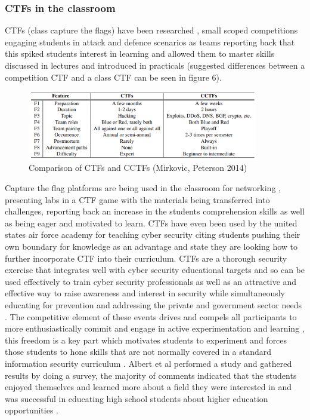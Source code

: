\documentclass[12pt,a4paper]{article}
\begin{document}
\subsubsection{CTFs in the classroom}
CTFs (class capture the flags) have been researched \cite{mirkovic2014class}, small scoped competitions engaging students in attack and defence scenarios as teams reporting back that this spiked students interest in learning and allowed them to master skills discussed in lectures and introduced in practicals (suggested differences between a competition CTF and a class CTF can be seen in figure 6).  
\begin{figure}[h]
    \centering
    \includegraphics[width=0.9\textwidth]{Figs/cctfs.PNG} 
    \caption{Comparison of CTFs and CCTFs (Mirkovic, Peterson 2014)}
\end{figure}   
Capture the flag platforms are being used in the classroom for networking \cite{prabawa2017using}, presenting labs in a CTF game with the materials being transferred into challenges, reporting back an increase in the students comprehension skills as well as being eager and motivated to learn. CTFs have even been used by the united states air force academy for teaching cyber security \cite{carlisle2015using} citing students pushing their own boundary for knowledge as an advantage and state they are looking how to further incorporate CTF into their curriculum. CTFs are a thorough security exercise that integrates well with cyber security educational targets and so can be used effectively to train cyber security professionals \cite{eagle2004capture1} as well as an attractive and effective way to raise awareness and interest in security while simultaneously educating for prevention and addressing the private and government sector needs \cite{albert2010high3}. The competitive element of these events drives and compels all participants to more enthusiastically commit and engage in active experimentation and learning \cite{albert2010high5}, this freedom is a key part which motivates students to experiment and forces those students to hone skills that are not normally covered in a standard information security curriculum \cite{eagle2004capture2}. Albert et al performed a study and gathered results by doing a survey, the majority of comments indicated that the students enjoyed themselves and learned more about a field they were interested in and was successful in educating high school students about higher education opportunities \cite{albert2010high6}. 
\end{document}

